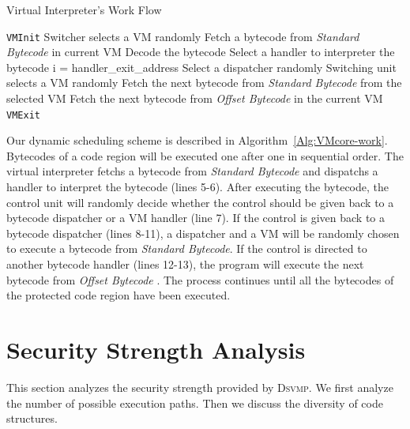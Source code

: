 \documentclass[preprint,12pt,3p]{elsarticle}
\newcommand{\DSVMP}{\textsc{Dsvmp}\xspace}
\begin{document}
\begin{algorithm}[t!]
\caption{Virtual Interpreter's Work Flow\label{Alg:VMcore-work}}
\begin{algorithmic}[1]
\STATE \texttt{VMInit}
\STATE Switcher selects a VM randomly
\STATE Fetch a bytecode from \emph{Standard Bytecode} in current VM
\STATE Decode the bytecode
\STATE Select a handler to interpreter the bytecode
\STATE i = handler\_exit\_address
\STATE Select a dispatcher randomly
\STATE Switching unit selects a VM randomly
\STATE Fetch the next bytecode from \emph{Standard Bytecode} from the selected VM
\ELSE [i == \texttt{handler}]
\STATE Fetch the next bytecode from \emph{Offset Bytecode} in the current VM
\ENDIF
\ENDWHILE
\STATE \texttt{VMExit}
\end{algorithmic}
\end{algorithm}

Our dynamic scheduling scheme is described in Algorithm~\ref{Alg:VMcore-work}. Bytecodes of a code region will
be executed one after one in sequential order.
The virtual interpreter fetchs a bytecode from \emph{Standard Bytecode} and dispatchs a handler to interpret the bytecode (lines 5-6).
After executing the bytecode, the control unit will randomly decide whether the control should be given back to a
bytecode dispatcher or a VM handler (line 7). If the control is given back to a bytecode dispatcher (lines 8-11), a
dispatcher and a VM will be randomly chosen to execute a bytecode from \emph{Standard Bytecode}. If the control is directed
to another bytecode handler (lines 12-13),  the program will execute the next bytecode from \emph{Offset Bytecode} .
The process continues until all the bytecodes of the protected code region
have been executed.




\section{Security Strength Analysis}\label{sec:s-eva}
This section analyzes the security strength provided by \DSVMP. We first analyze the number of possible execution paths. Then we discuss the diversity of code structures.
\end{document}
